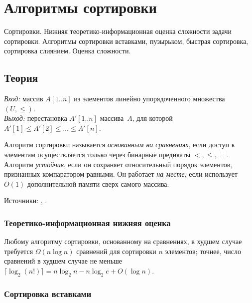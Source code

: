 
\section{Алгоритмы сортировки}
\label{sec:1.3.03-sorting}

\begin{ticket}
Сортировки. Нижняя теоретико-информационная оценка сложности задачи сортировки. Алгоритмы сортировки вставками, пузырьком, быстрая сортировка, сортировка слиянием. Оценка сложности.
\end{ticket}

\subsection*{Теория}

\begin{definition}
\label{def:sorting}
\emph{Вход:} массив $A[1..n]$ из элементов линейно упорядоченного
множества $(U, \leq)$.\\
\emph{Выход:} перестановка $A'[1..n]$ массива~$A$, для которой
$A'[1] \leq A'[2] \leq \dots \leq A'[n]$.
\end{definition}

Алгоритм сортировки называется \emph{основанным на сравнениях}, если
доступ к элементам осуществляется только через бинарные предикаты
$<, \leq, =$. Алгоритм \emph{устойчив}, если он сохраняет относительный
порядок элементов, признанных компаратором равными. Он работает
\emph{на месте}, если использует $O(1)$ дополнительной памяти сверх
самого массива.

Источники: \cite[гл.~2, 7, 8]{CLRS2013}, \cite{Skiena2014}.

\subsubsection*{Теоретико-информационная нижняя оценка}

\begin{theorem}
\label{thm:comparison-lb}
Любому алгоритму сортировки, основанному на сравнениях, в худшем случае
требуется $\Omega(n \log n)$ сравнений для сортировки $n$ элементов;
точнее, число сравнений в худшем случае не меньше
$\lceil \log_2 (n!) \rceil = n \log_2 n - n \log_2 e + O(\log n)$.
\end{theorem}

\subsubsection*{Сортировка вставками}

